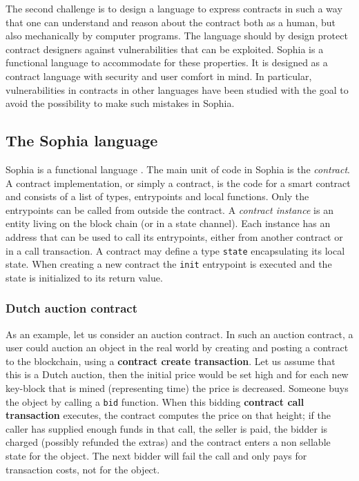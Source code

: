The second challenge is to design a language to express contracts in
such a way that one can understand and reason about the contract
both as a human, but also mechanically by computer programs. The
language should by design protect contract designers against
vulnerabilities that can be exploited. Sophia is a functional language
to accommodate for these properties. It is designed as a contract
language with security and user comfort in mind. In particular,
vulnerabilities in contracts in other languages
\cite{atzei2017survey,mehar2019understanding,delmolino2016step} have been studied with the goal to
avoid the possibility to make such mistakes in Sophia.

\subsection{The Sophia language}


Sophia is a functional language \cite{hughes1989functional}.
The main unit of code in Sophia is the \textit{contract}.
A contract implementation, or simply a contract, is the code for a
smart contract and consists of a list of types, entrypoints and local
functions. Only the entrypoints can be called from outside the
contract.   A \textit{contract instance} is an entity living on the
block chain (or in a state channel). Each instance has an address that
can be used to call its entrypoints, either from another contract or
in a call transaction.  A contract may define a type \texttt{state}
encapsulating its local state. When creating a new contract the
\texttt{init} entrypoint is executed and the state is initialized to its
return value.


\subsubsection{Dutch auction contract}

As an example, let us consider an auction contract.  In such an
auction contract, a user could auction an object in the real world by
creating and posting a contract to the blockchain, using a \textbf{contract
create transaction}. Let us assume that
this is a Dutch auction, then the initial price
would be set high and for each new key-block that is mined (representing
time) the price is decreased. Someone buys the object by calling a
\texttt{bid} function. When this bidding \textbf{contract call transaction} executes,
the contract computes the price on that height; if the caller has
supplied enough funds in that call, the seller is paid, the
bidder is charged (possibly refunded the extras) and the contract
enters a non sellable state for the object. The next bidder will fail
the call and only pays for transaction costs, not for the object.

